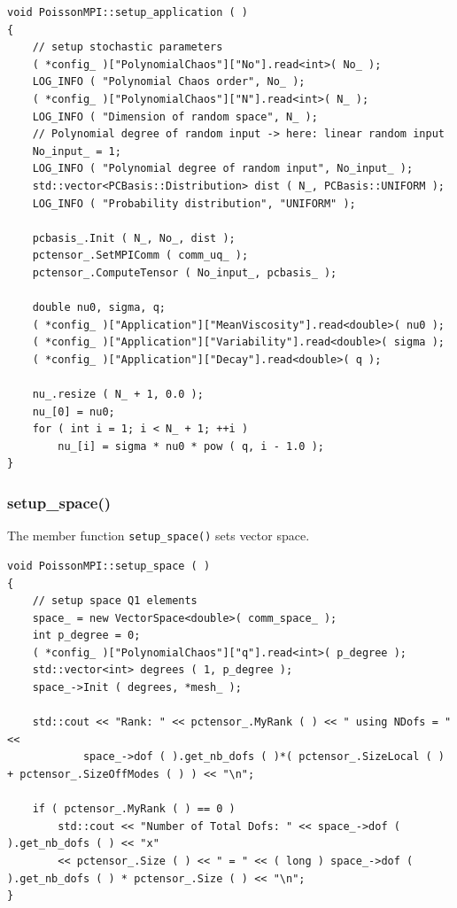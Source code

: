 \documentclass{article}
\begin{document}
\begin{lstlisting}
void PoissonMPI::setup_application ( )
{
    // setup stochastic parameters
    ( *config_ )["PolynomialChaos"]["No"].read<int>( No_ );
    LOG_INFO ( "Polynomial Chaos order", No_ );
    ( *config_ )["PolynomialChaos"]["N"].read<int>( N_ );
    LOG_INFO ( "Dimension of random space", N_ );
    // Polynomial degree of random input -> here: linear random input
    No_input_ = 1;
    LOG_INFO ( "Polynomial degree of random input", No_input_ );
    std::vector<PCBasis::Distribution> dist ( N_, PCBasis::UNIFORM );
    LOG_INFO ( "Probability distribution", "UNIFORM" );

    pcbasis_.Init ( N_, No_, dist );
    pctensor_.SetMPIComm ( comm_uq_ );
    pctensor_.ComputeTensor ( No_input_, pcbasis_ );

    double nu0, sigma, q;
    ( *config_ )["Application"]["MeanViscosity"].read<double>( nu0 );
    ( *config_ )["Application"]["Variability"].read<double>( sigma );
    ( *config_ )["Application"]["Decay"].read<double>( q );

    nu_.resize ( N_ + 1, 0.0 );
    nu_[0] = nu0;
    for ( int i = 1; i < N_ + 1; ++i )
        nu_[i] = sigma * nu0 * pow ( q, i - 1.0 );
}
\end{lstlisting}

\subsubsection{setup\_space()}

The member function \texttt{setup\_space()} sets vector space.

\begin{lstlisting}
void PoissonMPI::setup_space ( )
{
    // setup space Q1 elements
    space_ = new VectorSpace<double>( comm_space_ );
    int p_degree = 0;
    ( *config_ )["PolynomialChaos"]["q"].read<int>( p_degree );
    std::vector<int> degrees ( 1, p_degree );
    space_->Init ( degrees, *mesh_ );

    std::cout << "Rank: " << pctensor_.MyRank ( ) << " using NDofs = " <<
            space_->dof ( ).get_nb_dofs ( )*( pctensor_.SizeLocal ( ) + pctensor_.SizeOffModes ( ) ) << "\n";

    if ( pctensor_.MyRank ( ) == 0 )
        std::cout << "Number of Total Dofs: " << space_->dof ( ).get_nb_dofs ( ) << "x"
        << pctensor_.Size ( ) << " = " << ( long ) space_->dof ( ).get_nb_dofs ( ) * pctensor_.Size ( ) << "\n";
}
\end{lstlisting}
\end{document}
